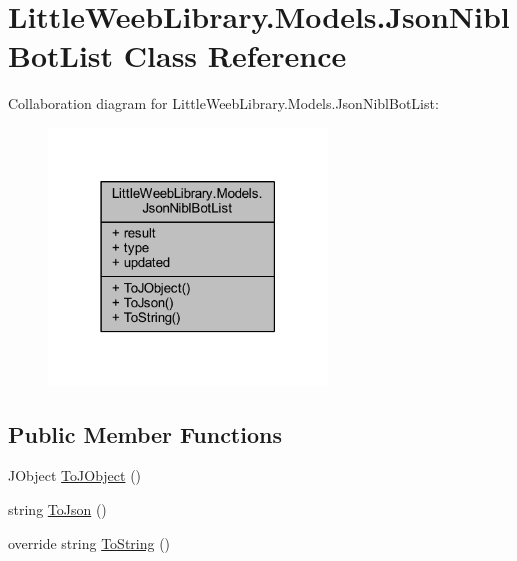 \hypertarget{class_little_weeb_library_1_1_models_1_1_json_nibl_bot_list}{}\section{Little\+Weeb\+Library.\+Models.\+Json\+Nibl\+Bot\+List Class Reference}
\label{class_little_weeb_library_1_1_models_1_1_json_nibl_bot_list}


Collaboration diagram for Little\+Weeb\+Library.\+Models.\+Json\+Nibl\+Bot\+List\+:\nopagebreak
\begin{figure}[H]
\begin{center}
\leavevmode
\includegraphics[width=210pt]{class_little_weeb_library_1_1_models_1_1_json_nibl_bot_list__coll__graph}
\end{center}
\end{figure}
\subsection*{Public Member Functions}
\begin{DoxyCompactItemize}
\item 
J\+Object \mbox{\hyperlink{class_little_weeb_library_1_1_models_1_1_json_nibl_bot_list_a6c959577c5cc2851d1a2c830fd6f4961}{To\+J\+Object}} ()
\item 
string \mbox{\hyperlink{class_little_weeb_library_1_1_models_1_1_json_nibl_bot_list_a852d40e99ff93888a16fdba1d45aee14}{To\+Json}} ()
\item 
override string \mbox{\hyperlink{class_little_weeb_library_1_1_models_1_1_json_nibl_bot_list_aff76def0d8bf7b2d2f3b985a0507d6a0}{To\+String}} ()
\end{DoxyCompactItemize}
